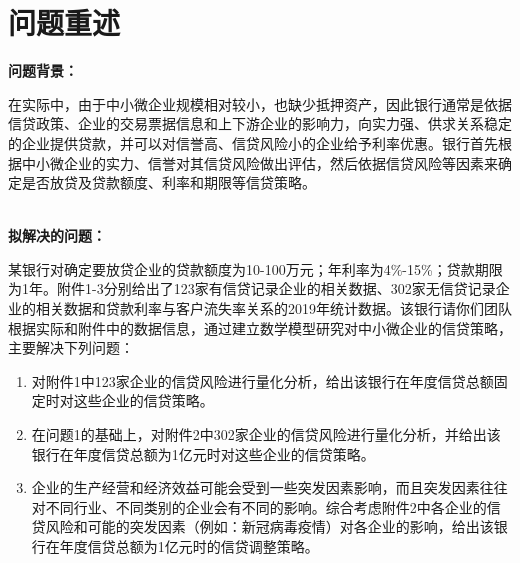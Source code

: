 \ifx\allfiles\undefined


\else
\fi


\part{问题重述}

\noindent \textbf{{\large 问题背景：}}

在实际中，由于中小微企业规模相对较小，也缺少抵押资产，因此银行通常是依据信贷政策、企业的交易票据信息和上下游企业的影响力，向实力强、供求关系稳定的企业提供贷款，并可以对信誉高、信贷风险小的企业给予利率优惠。银行首先根据中小微企业的实力、信誉对其信贷风险做出评估，然后依据信贷风险等因素来确定是否放贷及贷款额度、利率和期限等信贷策略。

~\\

\noindent \textbf{{\large 拟解决的问题：}}

某银行对确定要放贷企业的贷款额度为10-100万元；年利率为4\%-15\%；贷款期限为1年。附件1-3分别给出了123家有信贷记录企业的相关数据、302家无信贷记录企业的相关数据和贷款利率与客户流失率关系的2019年统计数据。该银行请你们团队根据实际和附件中的数据信息，通过建立数学模型研究对中小微企业的信贷策略，主要解决下列问题：

\begin{enumerate}[(1)]

	\item 对附件1中123家企业的信贷风险进行量化分析，给出该银行在年度信贷总额固定时对这些企业的信贷策略。



	\item 在问题1的基础上，对附件2中302家企业的信贷风险进行量化分析，并给出该银行在年度信贷总额为1亿元时对这些企业的信贷策略。


	\item 企业的生产经营和经济效益可能会受到一些突发因素影响，而且突发因素往往对不同行业、不同类别的企业会有不同的影响。综合考虑附件2中各企业的信贷风险和可能的突发因素（例如：新冠病毒疫情）对各企业的影响，给出该银行在年度信贷总额为1亿元时的信贷调整策略。


\end{enumerate}


\newpage


\ifx\allfiles\undefined

\fi